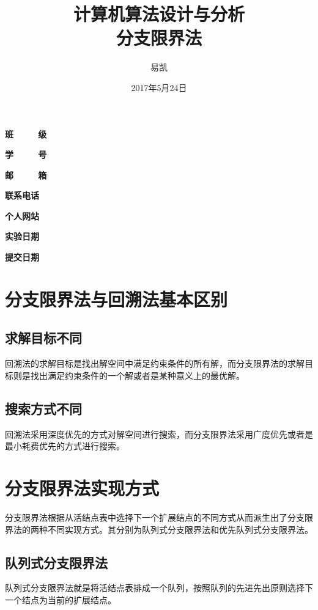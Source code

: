 \documentclass[UTF8]{ctexart}
\title{\Huge{计算机算法设计与分析\\ 分支限界法}}
\author{\Huge{易凯}}
\date{\Huge{2017年5月24日}}
\begin{document}
    \maketitle
    \vspace{35mm}
    \begin{flushright}
    \Large{
    \textbf{班\ \ \ \ \ 级} 

    \textbf{学\ \ \ \ \ 号} 

    \textbf{邮\ \ \ \ \ 箱} 

    \textbf{联系电话} 

    \textbf{个人网站} 


      \textbf{实验日期} 

    \textbf{提交日期} 
    }
    \end{flushright}

    \newpage
  	\tableofcontents
  	\newpage
  	\listoffigures
    \newpage

    \section{分支限界法与回溯法基本区别}
    \subsection{求解目标不同}
    回溯法的求解目标是找出解空间中满足约束条件的所有解，而分支限界法的求解目标则是找出满足约束条件的一个解或者是某种意义上的最优解。

    \subsection{搜索方式不同}
    回溯法采用深度优先的方式对解空间进行搜索，而分支限界法采用广度优先或者是最小耗费优先的方式进行搜索。

    \section{分支限界法实现方式}
    分支限界法根据从活结点表中选择下一个扩展结点的不同方式从而派生出了分支限界法的两种不同实现方式。其分别为队列式分支限界法和优先队列式分支限界法。

    \subsection{队列式分支限界法}
    队列式分支限界法就是将活结点表排成一个队列，按照队列的先进先出原则选择下一个结点为当前的扩展结点。
\end{document}
